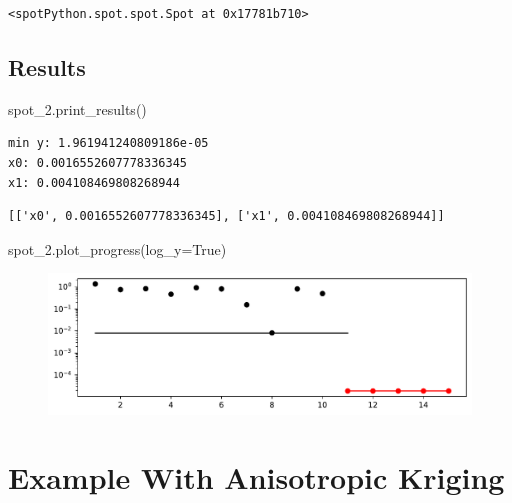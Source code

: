 \documentclass[
  letterpaper,
  DIV=11,
  numbers=noendperiod]{scrreprt}
\newenvironment{Shaded}{\begin{snugshade}}{\end{snugshade}}
\newcommand{\NormalTok}[1]{\textcolor[rgb]{0.00,0.23,0.31}{#1}}
\newcommand{\OperatorTok}[1]{\textcolor[rgb]{0.37,0.37,0.37}{#1}}
\newcommand{\VariableTok}[1]{\textcolor[rgb]{0.07,0.07,0.07}{#1}}
\begin{document}
\begin{verbatim}
<spotPython.spot.spot.Spot at 0x17781b710>
\end{verbatim}

\hypertarget{results-1}{%
\subsection{Results}\label{results-1}}

\begin{Shaded}
\begin{Highlighting}[]
\NormalTok{spot\_2.print\_results()}
\end{Highlighting}
\end{Shaded}

\begin{verbatim}
min y: 1.961941240809186e-05
x0: 0.0016552607778336345
x1: 0.004108469808268944
\end{verbatim}

\begin{verbatim}
[['x0', 0.0016552607778336345], ['x1', 0.004108469808268944]]
\end{verbatim}

\begin{Shaded}
\begin{Highlighting}[]
\NormalTok{spot\_2.plot\_progress(log\_y}\OperatorTok{=}\VariableTok{True}\NormalTok{)}
\end{Highlighting}
\end{Shaded}

\begin{figure}[H]

{\centering \includegraphics{009_num_spot_anisotropic_files/figure-pdf/cell-6-output-1.pdf}

}

\end{figure}

\hypertarget{example-with-anisotropic-kriging}{%
\section{Example With Anisotropic
Kriging}\label{example-with-anisotropic-kriging}}
\end{document}
